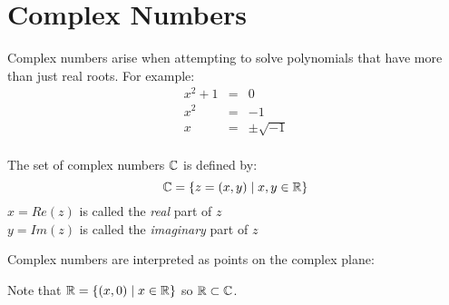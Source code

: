 \documentclass[letterpaper,12pt,fleqn]{article}
\begin{document}
\section*{Complex Numbers}
Complex numbers arise when attempting to solve polynomials that have more than
just real roots. For example:
\begin{eqnarray*}
x^2+1 &=& 0 \\
x^2 &=& -1 \\
x &=& \pm\sqrt{-1} \\
\end{eqnarray*}
\begin{definition}
The set of complex numbers $\mathbb{C}$ is defined by:
\[\mathbb{C}=\{z=(x,y)\mid x,y\in\mathbb{R}\}\]
$x=Re(z)$ is called the \emph{real} part of $z$ \\
$y=Im(z)$ is called the \emph{imaginary} part of $z$ \\
\end{definition}
Complex numbers are interpreted as points on the complex plane:
\begin{figure*}[h]
\setlength{\leftskip}{0.5in}
\end{figure*}

Note that $\mathbb{R}=\{(x,0)\mid x\in\mathbb{R}\}$ so $\mathbb{R}\subset\mathbb{C}$.
\end{document}
